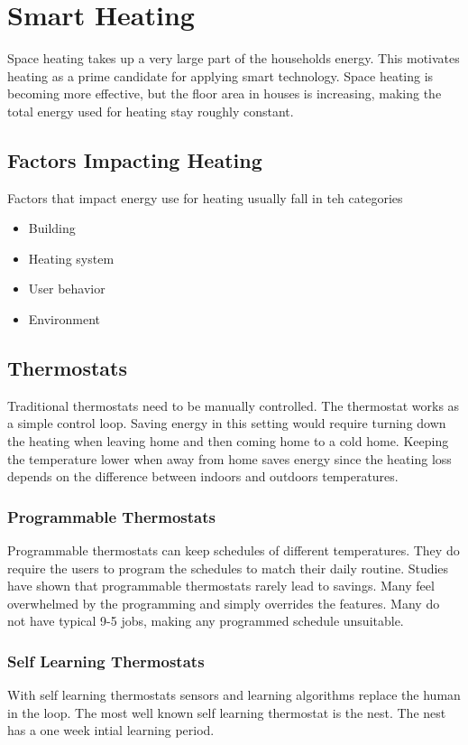 \section{Smart Heating}
Space heating takes up a very large part of the households energy.
This motivates heating as a prime candidate for applying smart technology.
Space heating is becoming more effective, but the floor area in houses is increasing, making the total energy used for heating stay roughly constant.

\subsection{Factors Impacting Heating}
Factors that impact energy use for heating usually fall in teh categories

\begin{itemize}
    \item Building
    \item Heating system
    \item User behavior
    \item Environment
\end{itemize}

\subsection{Thermostats}
Traditional thermostats need to be manually controlled.
The thermostat works as a simple control loop.
Saving energy in this setting would require turning down the heating when leaving home and then coming home to a cold home.
Keeping the temperature lower when away from home saves energy since the heating loss depends on the difference between indoors and outdoors temperatures. \\

\subsubsection{Programmable Thermostats}
Programmable thermostats can keep schedules of different temperatures.
They do require the users to program the schedules to match their daily routine.
Studies have shown that programmable thermostats rarely lead to savings.
Many feel overwhelmed by the programming and simply overrides the features.
Many do not have typical 9-5 jobs, making any programmed schedule unsuitable.

\subsubsection{Self Learning Thermostats}
With self learning thermostats sensors and learning algorithms replace the human in the loop.
The most well known self learning thermostat is the nest.
The nest has a one week intial learning period.\\


